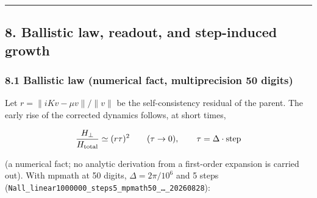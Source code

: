 \documentclass[
  10pt,
  a4paper,
]{article}
\begin{document}
\begin{center}\rule{0.5\linewidth}{0.5pt}\end{center}

\subsection{8. Ballistic law, readout, and step-induced
growth}\label{ballistic-law-readout-and-step-induced-growth}

\subsubsection{8.1 Ballistic law (numerical fact, multiprecision 50
digits)}\label{ballistic-law-numerical-fact-multiprecision-50-digits}

Let \(r=\|iKv-\mu v\|/\|v\|\) be the self-consistency residual of the
parent. The early rise of the corrected dynamics follows, at short
times,

\[
\frac{H_\perp}{H_{\rm total}}\simeq(r\tau)^2\qquad(\tau\to0),\qquad \tau=\Delta\cdot\text{step}
\]

(a numerical fact; no analytic derivation from a first-order expansion
is carried out). With mpmath at 50 digits, \(\Delta=2\pi/10^6\) and 5
steps (\texttt{Nall\_linear1000000\_steps5\_mpmath50\_…\_20260828}):
\end{document}
